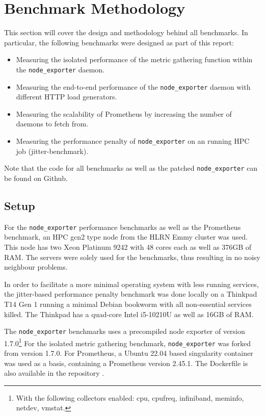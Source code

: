 \section{Benchmark Methodology}
This section will cover the design and methodology behind all benchmarks. In particular, the following
benchmarks were designed as part of this report:

\begin{itemize}
  \item Measuring the isolated performance of the metric gathering function within the \texttt{node\_exporter} daemon.
  \item Measuring the end-to-end performance of the \texttt{node\_exporter} daemon with different HTTP load generators.
  \item Measuring the scalability of Prometheus by increasing the number of daemons to fetch from.
  \item Measuring the performance penalty of \texttt{node\_exporter} on an running \ac{HPC} job (jitter-benchmark).
\end{itemize}

Note that the code for all benchmarks \cite{my_repo} as well as the patched \texttt{node\_exporter} \cite{my_node_exporter}
can be found on Github.

\subsection{Setup}

For the \texttt{node\_exporter} performance benchmarks as well as the Prometheus benchmark, an \ac{HPC} 
gcn2 type node from the HLRN Emmy cluster was used. This node has two Xeon Platinum 9242 with 48 cores each
as well as 376GB of RAM. The servers were solely used for the benchmarks, thus resulting in
no noisy neighbour problems.

In order to facilitate a more minimal operating system with less running services, the jitter-based 
performance penalty benchmark was done locally on a Thinkpad T14 Gen 1 running a minimal
Debian bookworm with all non-essential services killed. The Thinkpad has a quad-core Intel i5-10210U as well as 16GB of RAM.

The \texttt{node\_exporter} benchmarks uses a precompiled node exporter of version 1.7.0\footnote{With the following collectors enabled: cpu, cpufreq, infiniband, meminfo, netdev, vmstat.}
For the isolated metric gathering benchmark, 
\texttt{node\_exporter} was forked from version 1.7.0. For Prometheus, a Ubuntu 22.04 based singularity
container was used as a basis, containing a Prometheus version 2.45.1. The Dockerfile is also available
in the repository \cite{my_repo}.

